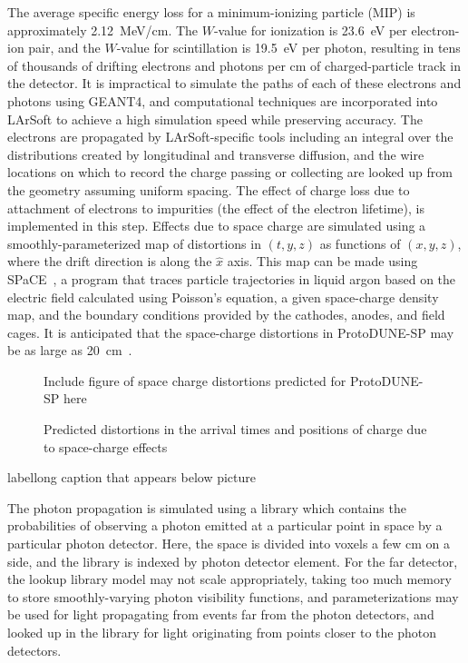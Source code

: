 The average specific energy loss for a minimum-ionizing particle (MIP)
is approximately 2.12~MeV/cm.  The $W$-value for ionization is 23.6~eV
per electron-ion pair, and the $W$-value for scintillation is 19.5~eV
per photon, resulting in tens of thousands of drifting electrons and
photons per cm of charged-particle track in the detector.  It is
impractical to simulate the paths of each of these electrons and
photons using GEANT4, and computational techniques are incorporated
into LArSoft to achieve a high simulation speed while preserving
accuracy.  The electrons are propagated by LArSoft-specific tools
including an integral over the distributions created by longitudinal
and transverse diffusion, and the wire locations on which to record
the charge passing or collecting are looked up from the geometry
assuming uniform spacing.  The effect of charge loss due to attachment
of electrons to impurities (the effect of the electron lifetime), is
implemented in this step.  Effects due to space charge are simulated
using a smoothly-parameterized map of distortions in $(t,y,z)$ as
functions of $(x,y,z)$, where the drift direction is along the
${\hat{x}}$ axis.  This map can be made using SPaCE~\cite{space}, a
program that traces particle trajectories in liquid argon based on the
electric field calculated using Poisson's equation, a given
space-charge density map, and the boundary conditions provided by the
cathodes, anodes, and field cages.  It is anticipated that the
space-charge distortions in ProtoDUNE-SP may be as large as
20~cm~\cite{space}.  

\begin{figure}[htb]
\centering
Include figure of space charge distortions predicted for ProtoDUNE-SP
here
\caption{Predicted distortions in the arrival times and positions of
  charge due to space-charge effects~\protect\cite{space}}
\label{fig:spacecharge}
\end{figure}


\begin{cdrfigure}{label}{long caption that appears below picture}
\end{cdrfigure}


The photon propagation is simulated using a library which contains the
probabilities of observing a photon emitted at a particular point in
space by a particular photon detector.  Here, the space is divided
into voxels a few cm on a side, and the library is indexed by photon
detector element.  For the far detector, the lookup library model may
not scale appropriately, taking too much memory to store
smoothly-varying photon visibility functions, and parameterizations
may be used for light propagating from events far from the photon
detectors, and looked up in the library for light originating from
points closer to the photon detectors.

